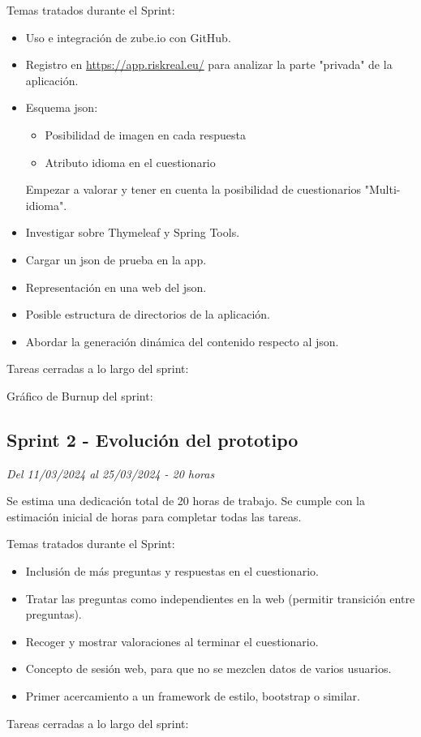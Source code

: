 Temas tratados durante el Sprint:

\begin{itemize}
	\item
	Uso e integración de zube.io con GitHub.
	\item
	Registro en \url{https://app.riskreal.eu/} para analizar la parte "privada" de la aplicación.
	\item
	Esquema json:
	\begin{itemize}
		\item
		Posibilidad de imagen en cada respuesta
		\item
		Atributo idioma en el cuestionario
	\end{itemize}
	Empezar a valorar y tener en cuenta la posibilidad de cuestionarios "Multi-idioma".
	\item
	Investigar sobre Thymeleaf y Spring Tools.
	\item
	Cargar un json de prueba en la app.
	\item
	Representación en una web del json.
	\item
	Posible estructura de directorios de la aplicación.
	\item
	Abordar la generación dinámica del contenido respecto al json.
\end{itemize}
\clearpage
Tareas  cerradas a lo largo del sprint:

Gráfico de Burnup del sprint:

\clearpage
\subsection{Sprint 2 - Evolución del prototipo}
\textit{Del 11/03/2024 al 25/03/2024 - 20 horas}

Se estima una dedicación total de 20 horas de trabajo.
Se cumple con la estimación inicial de horas para completar todas las tareas.

Temas tratados durante el Sprint:

\begin{itemize}
	\item
	Inclusión de más preguntas y respuestas en el cuestionario.
	\item
	Tratar las preguntas como independientes en la web (permitir transición entre preguntas).
	\item
	Recoger y mostrar valoraciones al terminar el cuestionario.
	\item
	Concepto de sesión web, para que no se mezclen datos de varios usuarios.
	\item
	Primer acercamiento a un framework de estilo, bootstrap o similar.
\end{itemize}
\clearpage
Tareas cerradas a lo largo del sprint:

